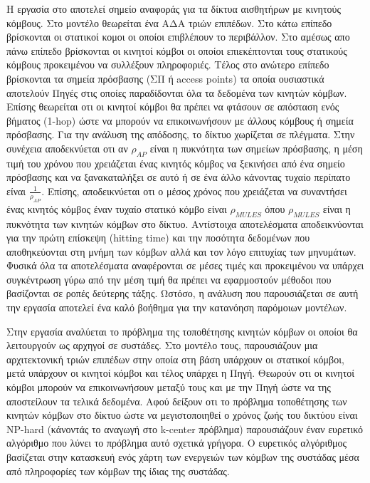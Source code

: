 Η εργασία στο \cite{data_mules} αποτελεί σημείο αναφοράς για τα δίκτυα αισθητήρων με κινητούς κόμβους. Στο μοντέλο θεωρείται ένα ΑΔΑ τριών επιπέδων. Στο κάτω επίπεδο
βρίσκονται οι στατικοί κομοι οι οποίοι επιβλέπουν το περιβάλλον. Στο αμέσως απο πάνω επίπεδο βρίσκονται οι κινητοί κόμβοι οι οποίοι επιεκέπτονται τους στατικούς
κόμβους προκειμένου να συλλέξουν πληροφοριές. Τέλος στο ανώτερο επίπεδο βρίσκονται τα σημεία πρόσβασης (ΣΠ ή access points) τα οποία ουσιαστικά αποτελούν Πηγές στις
οποίες παραδίδονται όλα τα δεδομένα των κινητών κόμβων. Επίσης θεωρείται οτι οι κινητοί κόμβοι θα πρέπει να φτάσουν σε απόσταση ενός βήματος (1-hop) ώστε να μπορούν
να επικοινωνήσουν με άλλους κόμβους ή σημεία πρόσβασης. Για την ανάλυση της απόδοσης, το δίκτυο χωρίζεται σε πλέγματα. Στην συνέχεια αποδεκνύεται οτι αν $\rho_{AP}$
είναι η πυκνότητα των σημείων πρόσβασης, η μέση τιμή του χρόνου που χρειάζεται ένας κινητός κόμβος να ξεκινήσει από ένα σημείο πρόσβασης και να ξανακαταλήξει σε αυτό
ή σε ένα άλλο κάνοντας τυχαίο περίπατο είναι $\frac{1}{\rho_{AP}}$. Επίσης, αποδεικνύεται οτι ο μέσος χρόνος που χρειάζεται να συναντήσει ένας κινητός κόμβος έναν
τυχαίο στατικό κόμβο είναι $\rho_{MULES}$ όπου $\rho_{MULES}$ είναι η πυκνότητα των κινητών κόμβων στο δίκτυο. Αντίστοιχα αποτελέσματα αποδεικνύονται για την πρώτη
επίσκεψη (hitting time) και την ποσότητα δεδομένων που αποθηκεύονται στη μνήμη των κόμβων αλλά και τον λόγο επιτυχίας των μηνυμάτων. Φυσικά όλα τα αποτελέσματα
αναφέρονται σε μέσες τιμές και προκειμένου να υπάρχει συγκέντρωση γύρω από την μέση τιμή θα πρέπει να εφαρμοστούν μέθοδοι που βασίζονται σε ροπές δεύτερης τάξης.
Ωστόσο, η ανάλυση που παρουσιάζεται σε αυτή την εργασία αποτελεί ένα καλό βοήθημα για την κατανόηση παρόμοιων μοντέλων.

Στην εργασία \cite{yuanyuan1} αναλύεται το πρόβλημα της τοποθέτησης κινητών κόμβων οι οποίοι θα λειτουργούν ως αρχηγοί σε συστάδες. Στο μοντέλο τους, παρουσιάζουν
μια αρχιτεκτονική τριών επιπέδων στην οποία στη βάση υπάρχουν οι στατικοί κόμβοι, μετά υπάρχουν οι κινητοί κόμβοι και τέλος υπάρχει η Πηγή. Θεωρούν οτι οι
κινητοί κόμβοι μπορούν να επικοινωνήσουν μεταξύ τους και με την Πηγή ώστε να της αποστείλουν τα τελικά δεδομένα. Αφού δείξουν οτι το πρόβλημα τοποθέτησης των κινητών
κόμβων στο δίκτυο ώστε να μεγιστοποιηθεί ο χρόνος ζωής του δικτύου είναι NP-hard (κάνοντάς το αναγωγή στο k-center πρόβλημα) παρουσιάζουν έναν ευρετικό αλγόριθμο που
λύνει το πρόβλημα αυτό σχετικά γρήγορα. Ο ευρετικός αλγόριθμος βασίζεται στην κατασκευή ενός χάρτη των ενεργειών των κόμβων της συστάδας μέσα από πληροφορίες των
κόμβων της ίδιας της συστάδας.


